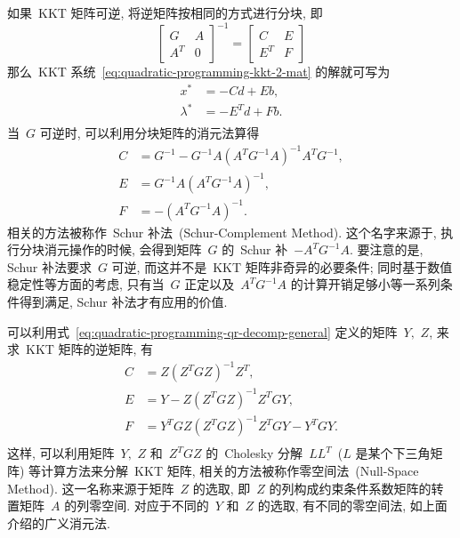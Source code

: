 如果~KKT 矩阵可逆, 将逆矩阵按相同的方式进行分块, 即
\begin{equation}
\label{eq:quadratic-programming-kkt-inverse}
\begin{bmatrix} G & A \\ A^T & 0 \end{bmatrix}^{-1} = \begin{bmatrix} C & E \\ E^T & F \end{bmatrix}
\end{equation}
那么~KKT 系统~\eqref{eq:quadratic-programming-kkt-2-mat} 的解就可写为
\begin{equation}
\label{eq:quadratic-programming-kkt-sol-1}
\begin{aligned}
{x}^* & = - C {d} + E {b}, \\
{\lambda}^* & = - E^T {d} + F {b}. \\
\end{aligned}
\end{equation}
当~$G$ 可逆时, 可以利用分块矩阵的消元法算得
\begin{equation}
\label{eq:quadratic-programming-kkt-inv-1}
\begin{aligned}
C & = G^{-1} - G^{-1} A \left( A^TG^{-1}A \right)^{-1} A^T G^{-1},\\
E & = G^{-1} A \left( A^TG^{-1}A \right)^{-1},\\
F & = - \left( A^TG^{-1}A \right)^{-1}.
\end{aligned}
\end{equation}
相关的方法被称作~Schur 补法~(Schur-Complement Method). 这个名字来源于, 执行分块消元操作的时候, 会得到矩阵~$G$ 的~Schur 补~$-A^TG^{-1}A.$ 要注意的是, Schur 补法要求~$G$ 可逆, 而这并不是~KKT 矩阵非奇异的必要条件; 同时基于数值稳定性等方面的考虑, 只有当~$G$ 正定以及~$A^TG^{-1}A$ 的计算开销足够小等一系列条件得到满足, Schur 补法才有应用的价值.

可以利用式~\eqref{eq:quadratic-programming-qr-decomp-general} 定义的矩阵~$Y,$ $Z$, 来求~KKT 矩阵的逆矩阵, 有
\begin{equation}
\label{eq:quadratic-programming-kkt-inv-2}
\begin{aligned}
C & = Z \left( Z^T G Z \right)^{-1} Z^T,\\
E & = Y - Z \left( Z^T G Z \right)^{-1} Z^T G Y,\\
F & = Y^T G Z \left( Z^T G Z \right)^{-1} Z^T G Y - Y^T G Y.\\
\end{aligned}
\end{equation}
这样, 可以利用矩阵~$Y,$ $Z$ 和~$Z^T G Z$ 的~Cholesky 分解~$L L^T$~($L$ 是某个下三角矩阵) 等计算方法来分解~KKT 矩阵, 相关的方法被称作零空间法~(Null-Space Method). 这一名称来源于矩阵~$Z$ 的选取, 即~$Z$ 的列构成约束条件系数矩阵的转置矩阵~$A$ 的列零空间. 对应于不同的~$Y$ 和~$Z$ 的选取, 有不同的零空间法, 如上面介绍的广义消元法.
